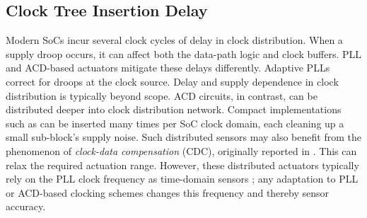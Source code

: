 \documentclass[twoside,9pt,journal,letterpage]{IEEEtran}
\begin{document}
\vspace{-10pt}
\subsection{Clock Tree Insertion Delay}
\label{sec:clktree}

Modern SoCs incur several clock cycles of delay in clock distribution. When a supply droop occurs, it can affect both the data-path logic and clock buffers. PLL and ACD-based actuators mitigate these delays differently. Adaptive PLLs correct for droops at the clock source. Delay and supply dependence in clock distribution is typically beyond scope. ACD circuits, in contrast, can be distributed deeper into clock distribution network. Compact implementations such as \cite{kwak2016self} can be inserted many times per SoC clock domain, each cleaning up a small sub-block's supply noise. Such distributed sensors may also benefit from the phenomenon of \textit{clock-data compensation} (CDC), originally reported in \cite{wong2006enhancing}. This can relax the required actuation range. However, these distributed actuators typically rely on the PLL clock frequency as time-domain sensors \cite{kwak2016self}; any adaptation to PLL or ACD-based clocking schemes changes this frequency and thereby sensor accuracy.


\vspace{-10pt}
\end{document}
